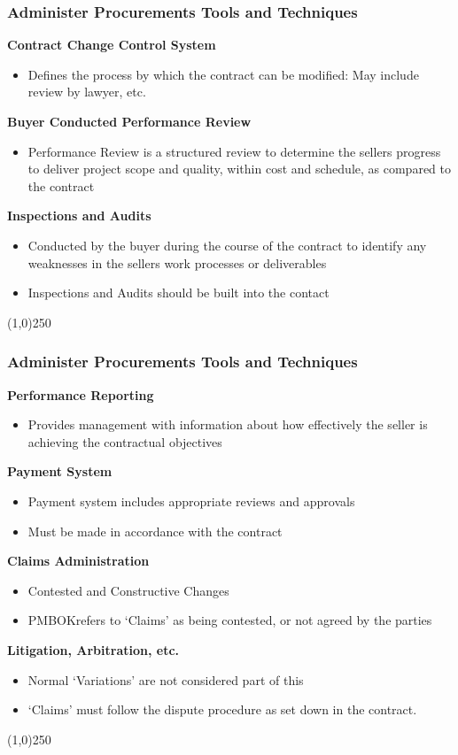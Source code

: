 \begin{frame}
\frametitle{Administer Procurements \hfill\hfill Tools and Techniques}
\textbf{Contract Change Control System}
		\begin{itemize}
			\item Defines the process by which the contract can be modified: May include review by lawyer, etc.
		\end{itemize}
\textbf{Buyer Conducted Performance Review}
		\begin{itemize}
			\item Performance Review is a structured review to determine the sellers progress to deliver project scope and quality, within cost and schedule, as compared to the contract
		\end{itemize}
\textbf{Inspections and Audits}
\begin{itemize}
			\item Conducted by the buyer during the course of the contract to identify any weaknesses in the sellers work processes or deliverables
		\item Inspections and Audits should be built into the contact 
		\end{itemize}
\end{frame}\begin{center}\line(1,0){250}\end{center}





\begin{frame}
\frametitle{Administer Procurements \hfill\hfill Tools and Techniques}
\textbf{Performance Reporting}
		\begin{itemize}
			\item Provides management with information about how effectively the seller is achieving the contractual objectives
		\end{itemize}
\textbf{Payment System}
		\begin{itemize}
			\item Payment system includes appropriate reviews and approvals
			\item Must be made in accordance with the contract
		\end{itemize}
\textbf{Claims Administration}
		\begin{itemize}
			\item Contested and Constructive Changes
			\item PMBOK\textregistered refers to `Claims' as being contested, or not agreed by the parties
		\end{itemize}
\textbf{Litigation, Arbitration, etc.}
		\begin{itemize}
			\item Normal `Variations' are not considered part of this
			\item `Claims' must follow the dispute procedure as set down in the contract.
		\end{itemize}
\end{frame}\begin{center}\line(1,0){250}\end{center}




